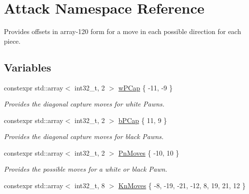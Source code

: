 \hypertarget{namespaceAttack}{}\section{Attack Namespace Reference}
\label{namespaceAttack}


Provides offsets in array-\/120 form for a move in each possible direction for each piece.  


\subsection*{Variables}
\begin{DoxyCompactItemize}
\item 
\mbox{\label{namespaceAttack_aba774adc537591a2dace8ebf2215027d}} 
constexpr std\+::array$<$ int32\+\_\+t, 2 $>$ \mbox{\hyperlink{namespaceAttack_aba774adc537591a2dace8ebf2215027d}{w\+P\+Cap}} \{ -\/11, -\/9 \}
\begin{DoxyCompactList}\small\item\em Provides the diagonal capture moves for white Pawns. \end{DoxyCompactList}\item 
\mbox{\label{namespaceAttack_a17e2306ab0379a6b31c39653c8328455}} 
constexpr std\+::array$<$ int32\+\_\+t, 2 $>$ \mbox{\hyperlink{namespaceAttack_a17e2306ab0379a6b31c39653c8328455}{b\+P\+Cap}} \{ 11, 9 \}
\begin{DoxyCompactList}\small\item\em Provides the diagonal capture moves for black Pawns. \end{DoxyCompactList}\item 
\mbox{\label{namespaceAttack_ad86fe8d8652f19e9d182fca575ad56dc}} 
constexpr std\+::array$<$ int32\+\_\+t, 2 $>$ \mbox{\hyperlink{namespaceAttack_ad86fe8d8652f19e9d182fca575ad56dc}{Pn\+Moves}} \{ -\/10, 10 \}
\begin{DoxyCompactList}\small\item\em Provides the possible moves for a white or black Pawn. \end{DoxyCompactList}\item 
\mbox{\label{namespaceAttack_a9766aec9ff1db2b4978b74e87b9220a1}} 
constexpr std\+::array$<$ int32\+\_\+t, 8 $>$ \mbox{\hyperlink{namespaceAttack_a9766aec9ff1db2b4978b74e87b9220a1}{Kn\+Moves}} \{ -\/8, -\/19, -\/21, -\/12, 8, 19, 21, 12 \}

\end{DoxyCompactItemize}
